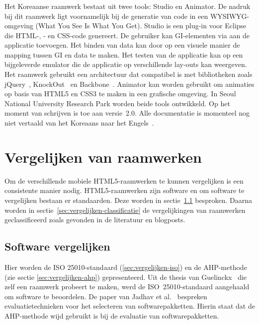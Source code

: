 \subsubsection{\davinci}%
Het Koreaanse raamwerk \davinci{} bestaat uit twee tools:  \davinci{} Studio en \davinci{} Animator.
De nadruk bij dit raamwerk ligt voornamelijk bij de generatie van code in een WYSIWYG-omgeving (What You See Is What You Get).
\davinci{} Studio is een plug-in voor Eclipse die HTML-,  \js{}- en CSS-code genereert.
De gebruiker kan GI-elementen via  aan de applicatie toevoegen.
Het binden van data kan door op een visuele manier de mapping tussen GI en data te maken.
Het testen van de applicatie kan op een bijgeleverde emulator die de applicatie op verschillende lay-outs kan weergeven.
Het raamwerk gebruikt een architectuur dat compatibel is met  bibliotheken zoals jQuery~\cite{JQuery2013a}, KnockOut~\cite{KnockOut2013} en Backbone~\cite{Backbone2013}.
\davinci{} Animator kan worden gebruikt om animaties op basis van HTML5 en CSS3 te maken in een grafische omgeving.
In Seoul National University Research Park worden beide tools ontwikkeld.
Op het moment van schrijven is \davinci{} toe aan versie~2.0.  
Alle documentatie is momenteel nog niet vertaald van het Koreaans naar het Engels~\cite{Incross}.

 

\section{Vergelijken van raamwerken} 
\label{sec:vergelijken-raamwerken}
Om de verschillende mobiele HTML5-raamwerken te kunnen vergelijken is een consistente manier nodig.
HTML5-raamwerken zijn software en om software te vergelijken bestaan er standaarden.
Deze worden in sectie~\ref{sec:vergelijken-standaarden} besproken.
Daarna worden in sectie~\ref{sec:vergelijken-classificatie} de vergelijkingen van raamwerken geclassificeerd zoals gevonden in de literatuur en blogposts.

\subsection{Software vergelijken}
\label{sec:vergelijken-standaarden}
Hier worden de ISO 25010-standaard (\ref{sec:vergelijken-iso}) en de AHP-methode (zie sectie \ref{sec:vergelijken-ahp}) gepresenteerd.  
Uit de thesis van Guelinckx~\cite{Guelinckx2012} die zelf een raamwerk probeert te maken, werd de ISO~25010-standaard aangehaald om software te beoordelen.
De paper van Jadhav et al.~\cite{Jadhav2009} bespreken evaluatietechnieken voor het selecteren van softwarepakketten.
Hierin staat dat de AHP-methode wijd gebruikt is bij de evaluatie van softwarepakketten.

